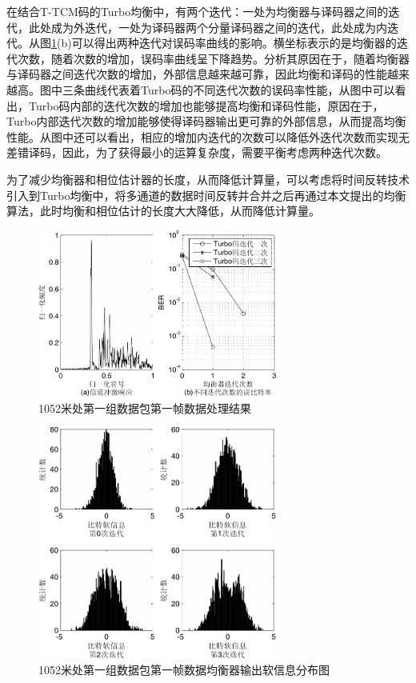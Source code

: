 在结合T-TCM码的Turbo均衡中，有两个迭代：一处为均衡器与译码器之间的迭代，此处成为外迭代，一处为译码器两个分量译码器之间的迭代，此处成为内迭代。从图\ref{fig:6.9}(b)可以得出两种迭代对误码率曲线的影响。横坐标表示的是均衡器的迭代次数，随着次数的增加，误码率曲线呈下降趋势。分析其原因在于，随着均衡器与译码器之间迭代次数的增加，外部信息越来越可靠，因此均衡和译码的性能越来越高。图中三条曲线代表着Turbo码的不同迭代次数的误码率性能，从图中可以看出，Turbo码内部的迭代次数的增加也能够提高均衡和译码性能，原因在于，Turbo内部迭代次数的增加能够使得译码器输出更可靠的外部信息，从而提高均衡性能。从图中还可以看出，相应的增加内迭代的次数可以降低外迭代次数而实现无差错译码，因此，为了获得最小的运算复杂度，需要平衡考虑两种迭代次数。

为了减少均衡器和相位估计器的长度，从而降低计算量，可以考虑将时间反转技术引入到Turbo均衡中，将多通道的数据时间反转并合并之后再通过本文提出的均衡算法，此时均衡和相位估计的长度大大降低，从而降低计算量。

\begin{figure}[htb]
  \begin{center}
    \includegraphics[width=0.7\textwidth]{images/result_1_1_s.pdf}
  \end{center}
  \caption{1052米处第一组数据包第一帧数据处理结果}
  \label{fig:6.9}
\end{figure}

\begin{figure}[htb]
  \begin{center}
    \includegraphics[width=0.7\textwidth]{images/softInfo_1_1.pdf}
  \end{center}
  \caption{1052米处第一组数据包第一帧数据均衡器输出软信息分布图}
  \label{fig:6.9s}
\end{figure}

